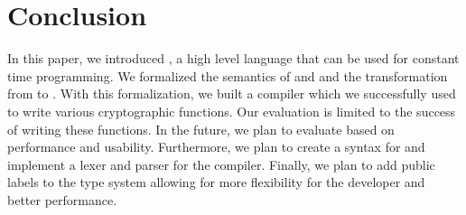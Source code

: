\section{Conclusion}
In this paper, we introduced \constc, a high level language that can be used for constant time programming. We formalized the semantics of \constc and \ccore and the transformation from \constc to \ccore. With this formalization, we built a \constc compiler which we successfully used to write various cryptographic functions. Our evaluation is limited to the success of writing these functions. In the future, we plan to evaluate \constc based on performance and usability. Furthermore, we plan to create a syntax for \constc and implement a lexer and parser for the compiler. Finally, we plan to add public labels to the type system allowing for more flexibility for the developer and better performance.
